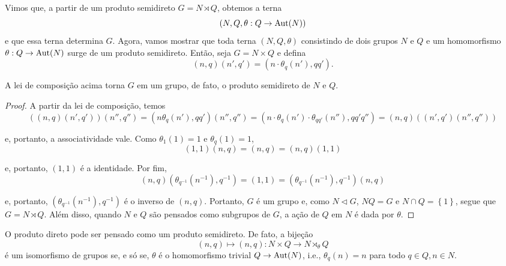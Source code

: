 	Vimos que, a partir de um produto semidireto $G = N \rtimes Q$, obtemos a terna
	\begin{equation*}
	    (N, Q, \theta:Q\to\operatorname{Aut}(N))
	\end{equation*}
	e que essa terna determina $G$. Agora, vamos mostrar que toda terna 
	$(N,Q,\theta)$ consistindo de dois grupos $N$ e $Q$ e um homomorfismo $\theta:Q\to\operatorname{Aut}(N)$ 
	surge de um produto semidireto. Então, seja $G = N\times Q$ e defina
	\begin{equation*}
	    (n,q)(n',q') = (n\cdot\theta_q(n'), qq').
	\end{equation*} 
	\begin{prop}
	\label{produto semidireto a partir de grupos}
		A lei de composição acima torna $G$ em um grupo, de fato, o produto semidireto de $N$ e $Q$.
	\end{prop}
	\begin{proof}
		A partir da lei de composição, temos
		\begin{equation*}
		    ( (n,q)(n',q') )(n'',q'') 
		    = ( n\theta_q(n'), qq' )(n'',q'') 
		    = ( n\cdot\theta_q(n')\cdot\theta_{qq'}(n''), qq'q'' ) 
		    = (n,q)( (n',q')(n'',q'') )
		\end{equation*}
		\par\vspace{0.3cm} e, portanto, a associatividade vale. Como $\theta_1(1) = 1$ e $\theta_q(1) = 1$,
		\begin{equation*}
		    (1,1)(n,q) = (n,q) = (n,q)(1,1)
		\end{equation*}
		\par\vspace{0.3cm} e, portanto, $(1,1)$ é a identidade. Por fim, 
		\begin{equation*}
		    (n,q)( \theta_{q^{-1}}(n^{-1}), q^{-1} ) = (1,1) = ( \theta_{q^{-1}}(n^{-1}), q^{-1} )(n,q)
		\end{equation*}
		\par\vspace{0.3cm} e, portanto, $( \theta_{q^{-1}}(n^{-1}), q^{-1} )$ é o inverso de $(n,q)$. 
		Portanto, $G$ é um grupo e, como $N\vartriangleleft G$, $NQ=G$ e $N\cap Q = \left\{1\right\}$, 
		segue que $G = N \rtimes Q$. Além disso, quando $N$ e $Q$ são pensados como subgrupos de $G$, 
		a ação de $Q$ em $N$ é dada por $\theta$.
	\end{proof}
	O produto direto pode ser pensado como um produto semidireto. De fato, a bijeção
	\begin{equation*}
	    (n,q)\mapsto (n,q):N\times Q\to N \rtimes_{\theta} Q
	\end{equation*}
	é um isomorfismo de grupos se, e só se, $\theta$ é o homomorfismo trivial 
	$Q\to \operatorname{Aut}(N)$, i.e., $\theta_q(n) = n$ para todo $q\in Q, n\in N$.
	
